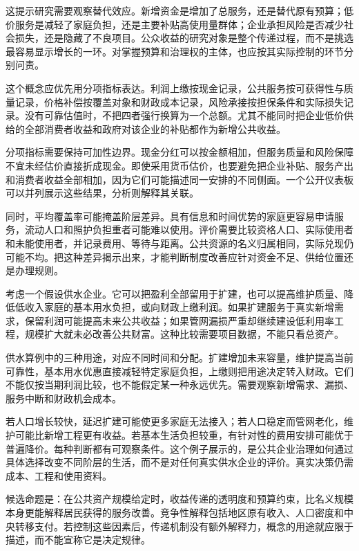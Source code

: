 \documentclass[UTF8,fontset=fandol,zihao=-4,oneside,openany]{ctexbook}
\begin{document}
这提示研究需要观察替代效应。新增资金是增加了总服务，还是替代原有预算；低价服务是减轻了家庭负担，还是主要补贴高使用量群体；企业承担风险是否减少社会损失，还是隐藏了不良项目。公众收益的研究对象是整个传递过程，而不是挑选最容易显示增长的一环。对掌握预算和治理权的主体，也应按其实际控制的环节分别问责。

这个概念应优先用分项指标表达。利润上缴按现金记录，公共服务按可获得性与质量记录，价格补偿按覆盖对象和财政成本记录，风险承接按担保条件和实际损失记录。没有可靠估值时，不把四者强行换算为一个总额。尤其不能同时把企业低价供给的全部消费者收益和政府对该企业的补贴都作为新增公共收益。

\label{arg:P087}
分项指标需要保持可加性边界。现金分红可以按金额相加，但服务质量和风险保障不宜未经估价直接折成现金。即使采用货币估价，也要避免把企业补贴、服务产出和消费者收益全部相加，因为它们可能描述同一安排的不同侧面。一个公开仪表板可以并列展示这些结果，分析则解释其关联。

同时，平均覆盖率可能掩盖阶层差异。具有信息和时间优势的家庭更容易申请服务，流动人口和照护负担重者可能难以使用。评价需要比较资格人口、实际使用者和未能使用者，并记录费用、等待与距离。公共资源的名义归属相同，实际兑现仍可能不均。把这种差异揭示出来，才能判断制度改善应针对资金不足、供给位置还是办理规则。

考虑一个假设供水企业。它可以把盈利全部留用于扩建，也可以提高维护质量、降低低收入家庭的基本用水负担，或向财政上缴利润。如果扩建服务于真实新增需求，保留利润可能提高未来公共收益；如果管网漏损严重却继续建设低利用率工程，规模扩大就未必改善公共财富。这种比较需要项目数据，不能只看总资产。

\label{arg:P088}
供水算例中的三种用途，对应不同时间和分配。扩建增加未来容量，维护提高当前可靠性，基本用水优惠直接减轻特定家庭负担，上缴则把用途决定转入财政。它们不能仅按当期利润比较，也不能假定某一种永远优先。需要观察新增需求、漏损、服务中断和财政机会成本。

若人口增长较快，延迟扩建可能使更多家庭无法接入；若人口稳定而管网老化，维护可能比新增工程更有收益。若基本生活负担较重，有针对性的费用安排可能优于普遍降价。每种判断都有可观察条件。这个例子展示的，是公共企业治理如何通过具体选择改变不同阶层的生活，而不是对任何真实供水企业的评价。真实决策仍需成本、工程和使用资料。

候选命题是：在公共资产规模给定时，收益传递的透明度和预算约束，比名义规模本身更能解释居民获得的服务改善。竞争性解释包括地区原有收入、人口密度和中央转移支付。若控制这些因素后，传递机制没有额外解释力，概念的用途就应限于描述，而不能宣称它是决定规律。
\end{document}
